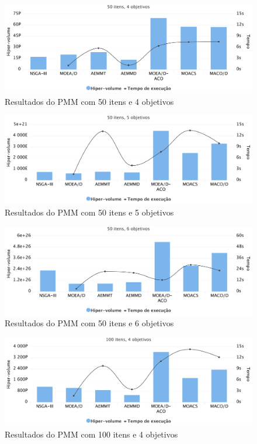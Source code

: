 \begin{figure}[!htbp]
	\caption{Resultados do PMM com 50 itens e 4 objetivos}
	\label{fig_exp4_i50o4}
	\includegraphics[width=1\textwidth]{cap_experimentos/figs/etapa4/i50o4}
\end{figure}

\begin{figure}[!htbp]
	\caption{Resultados do PMM com 50 itens e 5 objetivos}
	\label{fig_exp4_i50o5}
	\includegraphics[width=1\textwidth]{cap_experimentos/figs/etapa4/i50o5}
\end{figure}

\begin{figure}[!htbp]
	\caption{Resultados do PMM com 50 itens e 6 objetivos}
	\label{fig_exp4_i50o6}
	\includegraphics[width=1\textwidth]{cap_experimentos/figs/etapa4/i50o6}
\end{figure}

\begin{figure}[!htbp]
	\caption{Resultados do PMM com 100 itens e 4 objetivos}
	\label{fig_exp4_i100o4}
	\includegraphics[width=1\textwidth]{cap_experimentos/figs/etapa4/i100o4}
\end{figure}

